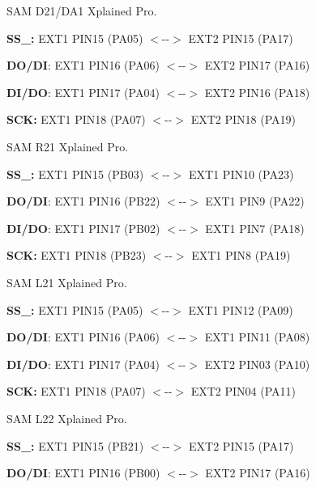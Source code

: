 \begin{DoxyItemize}
\item S\+AM D21/\+D\+A1 Xplained Pro.
\begin{DoxyItemize}
\item {\bfseries{S\+S\+\_\+:}} E\+X\+T1 P\+I\+N15 (P\+A05) $<$-\/-\/$>$ E\+X\+T2 P\+I\+N15 (P\+A17)
\item {\bfseries{D\+O/\+DI}}\+: E\+X\+T1 P\+I\+N16 (P\+A06) $<$-\/-\/$>$ E\+X\+T2 P\+I\+N17 (P\+A16)
\item {\bfseries{D\+I/\+DO}}\+: E\+X\+T1 P\+I\+N17 (P\+A04) $<$-\/-\/$>$ E\+X\+T2 P\+I\+N16 (P\+A18)
\item {\bfseries{S\+CK\+:}} E\+X\+T1 P\+I\+N18 (P\+A07) $<$-\/-\/$>$ E\+X\+T2 P\+I\+N18 (P\+A19)
\end{DoxyItemize}
\item S\+AM R21 Xplained Pro.
\begin{DoxyItemize}
\item {\bfseries{S\+S\+\_\+:}} E\+X\+T1 P\+I\+N15 (P\+B03) $<$-\/-\/$>$ E\+X\+T1 P\+I\+N10 (P\+A23)
\item {\bfseries{D\+O/\+DI}}\+: E\+X\+T1 P\+I\+N16 (P\+B22) $<$-\/-\/$>$ E\+X\+T1 P\+I\+N9 (P\+A22)
\item {\bfseries{D\+I/\+DO}}\+: E\+X\+T1 P\+I\+N17 (P\+B02) $<$-\/-\/$>$ E\+X\+T1 P\+I\+N7 (P\+A18)
\item {\bfseries{S\+CK\+:}} E\+X\+T1 P\+I\+N18 (P\+B23) $<$-\/-\/$>$ E\+X\+T1 P\+I\+N8 (P\+A19)
\end{DoxyItemize}
\item S\+AM L21 Xplained Pro.
\begin{DoxyItemize}
\item {\bfseries{S\+S\+\_\+:}} E\+X\+T1 P\+I\+N15 (P\+A05) $<$-\/-\/$>$ E\+X\+T1 P\+I\+N12 (P\+A09)
\item {\bfseries{D\+O/\+DI}}\+: E\+X\+T1 P\+I\+N16 (P\+A06) $<$-\/-\/$>$ E\+X\+T1 P\+I\+N11 (P\+A08)
\item {\bfseries{D\+I/\+DO}}\+: E\+X\+T1 P\+I\+N17 (P\+A04) $<$-\/-\/$>$ E\+X\+T2 P\+I\+N03 (P\+A10)
\item {\bfseries{S\+CK\+:}} E\+X\+T1 P\+I\+N18 (P\+A07) $<$-\/-\/$>$ E\+X\+T2 P\+I\+N04 (P\+A11)
\end{DoxyItemize}
\item S\+AM L22 Xplained Pro.
\begin{DoxyItemize}
\item {\bfseries{S\+S\+\_\+:}} E\+X\+T1 P\+I\+N15 (P\+B21) $<$-\/-\/$>$ E\+X\+T2 P\+I\+N15 (P\+A17)
\item {\bfseries{D\+O/\+DI}}\+: E\+X\+T1 P\+I\+N16 (P\+B00) $<$-\/-\/$>$ E\+X\+T2 P\+I\+N17 (P\+A16)

\end{DoxyItemize}
\end{DoxyItemize}
